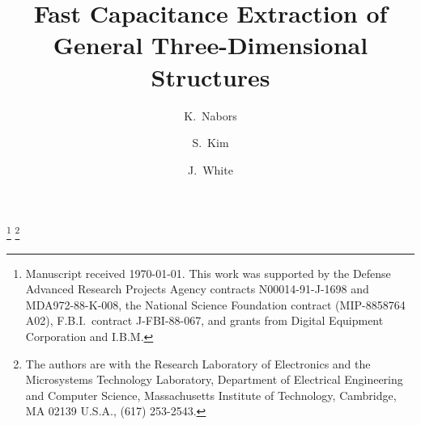 \newcommand{\banner}{{\em IEEE Trans.\ on Microwave Theory and Techniques}, 40(7):1496--1506, July 1992.}



\begin{singlespace}

\title {
Fast Capacitance Extraction of General Three-Dimensional Structures
}
\author{ 
  K.\ Nabors \and
  S.\ Kim \and
  J.\ White
}
\thanks{Manuscript received \today. 
This work was supported by the Defense Advanced Research Projects
Agency contracts N00014-91-J-1698 and MDA972-88-K-008, 
the National Science Foundation contract (MIP-8858764 A02),
F.B.I.\ contract J-FBI-88-067, and grants from Digital Equipment
Corporation and I.B.M.}
\thanks{The authors are with the
Research Laboratory of Electronics and the Microsystems Technology Laboratory,
Department of Electrical Engineering and Computer Science,
Massachusetts Institute of Technology,
Cambridge, MA   02139 U.S.A., (617) 253-2543.}
\date{}

\maketitle

\begin{abstract}

\end{abstract}

\end{singlespace}







\bibliocmd






















